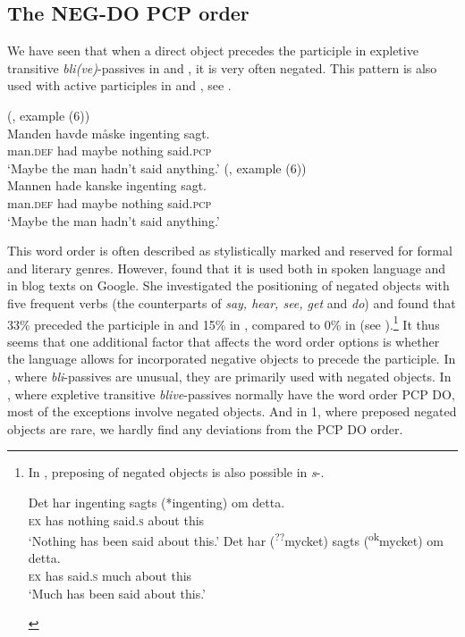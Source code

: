 \documentclass[output=paper]{LSP/langsci}
\begin{document}
\subsection{The NEG-DO PCP order}
We have seen that when a direct object precedes the participle in expletive transitive \textit{bli(ve)}{}-passives in  and , it is very often negated. This pattern is also used with active participles in  and , see .

\ea%
    \label{ex:engdahl:22}
    \ea
     (\citealt{Engels2012}, example (6))\\
\gll    Manden     havde   måske     ingenting   sagt.     \\
man\textsc{.def} had maybe  nothing  said\textsc{.pcp}
	\\
    \glt ‘Maybe the man hadn’t said anything.’
\ex
{} (\citealt{Engels2012}, example (6))\\
\gll     Mannen     hade   kanske   ingenting   sagt.     \\
  {man}\textsc{.def}    had    maybe    nothing    said\textsc{.pcp}\\
  \glt ‘Maybe the man hadn’t said anything.’
\z
\z

This word order is often described as stylistically marked and reserved for formal and literary genres. However, \citet{Engels2012} found that it is used both in spoken language and in blog texts on Google. She investigated the positioning of negated objects with five frequent verbs (the  counterparts of \textit{say, hear, see, get} and \textit{do}) and found that 33\% preceded the participle in  and 15\% in , compared to 0\% in  (see \citealt[Table 1]{Engels2012}).\footnote{In , preposing of negated objects is also possible in \textit{s}{}-.
\begin{xlist}[(ii)]
 \gll Det   har   ingenting   sagts   (*ingenting)   om   detta.\\
   \textsc{ex}   has nothing said.\textsc{s} {} about this\\ 
   \glt ‘Nothing has been said about this.’
\label{ex:engdahl:22b} 
\gll    Det   har ({\upshape\textsuperscript{??}}mycket)   sagts ({\upshape\textsuperscript{ok}}mycket)   om   detta.\\
   \textsc{ex}  has {} said.\textsc{s} much about this  
   \\
   \glt ‘Much has been said about this.'
\end{xlist}
}
\noindent It thus seems that one additional factor that affects the word order options is whether the language allows for incorporated negative objects to precede the participle. In , where \textit{bli}{}-passives are unusual, they are primarily used with negated objects. In , where expletive transitive \textit{blive}{}-passives normally have the word order PCP DO, most of the exceptions involve negated objects. And in  1, where preposed negated objects are rare, we hardly find any deviations from the PCP DO order.
\end{document}
